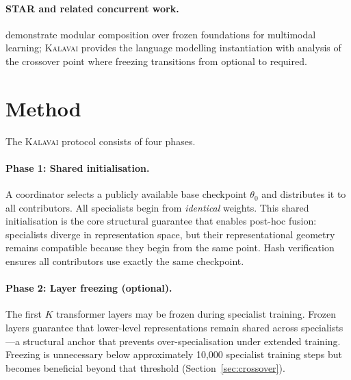 \documentclass{article}
\newcommand{\kalavai}{\textsc{Kalavai}\xspace}
\begin{document}
\paragraph{STAR and related concurrent work.} \citet{qin2025star} demonstrate modular composition over frozen foundations for multimodal learning; \kalavai provides the language modelling instantiation with analysis of the crossover point where freezing transitions from optional to required.

\section{Method}
\label{sec:method}

The \kalavai protocol consists of four phases.

\paragraph{Phase 1: Shared initialisation.} A coordinator selects a publicly available base checkpoint $\theta_0$ and distributes it to all contributors. All specialists begin from \emph{identical} weights. This shared initialisation is the core structural guarantee that enables post-hoc fusion: specialists diverge in representation space, but their representational geometry remains compatible because they begin from the same point. Hash verification ensures all contributors use exactly the same checkpoint.

\paragraph{Phase 2: Layer freezing (optional).} The first $K$ transformer layers may be frozen during specialist training. Frozen layers guarantee that lower-level representations remain shared across specialists---a structural anchor that prevents over-specialisation under extended training. Freezing is unnecessary below approximately 10,000 specialist training steps but becomes beneficial beyond that threshold (Section~\ref{sec:crossover}).
\end{document}
